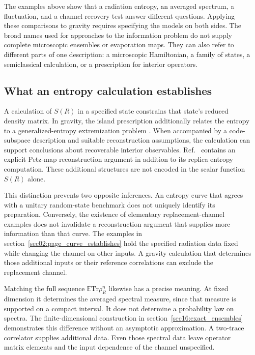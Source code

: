 \documentclass[11pt,letterpaper]{article}
\theoremstyle{plain}
\theoremstyle{definition}
\theoremstyle{remark}
\newcommand{\E}{\mathbb{E}}
\begin{document}
The examples above show that a radiation entropy, an averaged spectrum,
a fluctuation, and a channel recovery test answer different questions.
Applying these comparisons to gravity requires specifying the models
on both sides. The broad names used for approaches to the information
problem do not supply complete microscopic ensembles or evaporation
maps. They can also refer to different parts of one description:
a microscopic Hamiltonian, a family of states, a semiclassical
calculation, or a prescription for interior operators.

\subsection{What an entropy calculation establishes}

A calculation of $S(R)$ in a specified state constrains that state's
reduced density matrix. In gravity, the island prescription additionally
relates the entropy to a generalized-entropy extremization problem
\cite{engelhardtwall2015,penington2020,almheirietal2019}.
When accompanied by a code-subspace description and suitable
reconstruction assumptions, the calculation can support conclusions
about recoverable interior observables. Ref.~\cite{pssyetal2022}
contains an explicit Petz-map reconstruction argument in addition to
its replica entropy computation. These additional structures are not
encoded in the scalar function $S(R)$ alone.

This distinction prevents two opposite inferences. An entropy curve
that agrees with a unitary random-state benchmark does not uniquely
identify its preparation. Conversely, the existence of elementary
replacement-channel examples does not invalidate a reconstruction
argument that supplies more information than that curve. The examples
in section~\ref{sec02:page_curve_establishes} hold the specified
radiation data fixed while changing the channel on other inputs. A
gravity calculation that determines those additional inputs or their
reference correlations can exclude the replacement channel.

Matching the full sequence $\E\mathrm{Tr}\rho_R^n$ likewise has a
precise meaning. At fixed dimension it determines the averaged spectral
measure, since that measure is supported on a compact interval. It
does not determine a probability law on spectra. The finite-dimensional
construction in section~\ref{sec16:exact_ensembles} demonstrates
this difference without an asymptotic approximation. A two-trace
correlator supplies additional data. Even those spectral data leave
operator matrix elements and the input dependence of the channel
unspecified.
\end{document}
